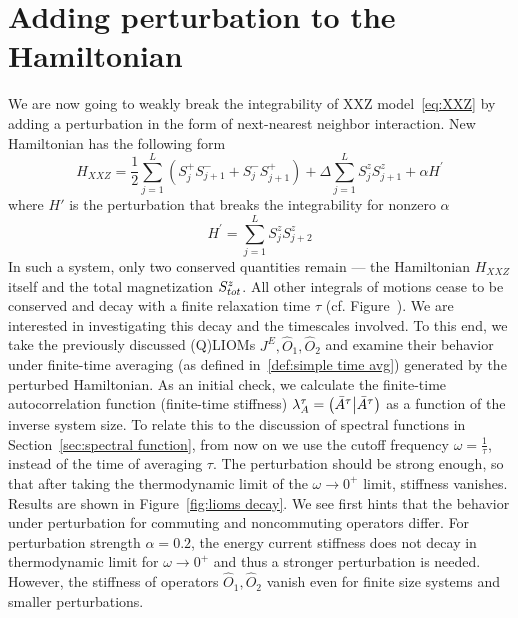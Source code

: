 \section{Adding perturbation to the Hamiltonian}
We are now going to weakly break the integrability of XXZ model~\eqref{eq:XXZ} 
by adding a perturbation in the form of next-nearest neighbor interaction.
New Hamiltonian has the following form
\begin{equation}
    H_{XXZ} = \frac{1}{2}\sum_{j = 1}^{L}\left( S^{+}_{j} S^{-}_{j+1} + 
    S^{-}_{j}S^{+}_{j+1} \right) + \Delta\sum_{j = 1}^{L} S^{z}_{j}S^{z}_{j+1}
    + \alpha H^{\prime}
    \label{eq:HXXZ perturbed}
\end{equation}
where \(H'\) is the perturbation that breaks the integrability for nonzero \(\alpha \)
\begin{equation}
    H^{\prime}=\sum_{j = 1}^{L} S^{z}_{j}S^{z}_{j+2}
    \label{eq:perturbation}
\end{equation}
In such a system, only two conserved quantities remain --- the Hamiltonian \(H_{XXZ}\) itself 
and the total magnetization \(S^{z}_{tot}\). All other integrals of motions cease to be conserved
and decay with a finite relaxation time \(\tau\) (cf. Figure~).
We are interested in investigating this decay and the timescales involved.
To this end, we take the previously discussed (Q)LIOMs \(J^E, \hat{O}_1,\hat{O}_2\)
and examine their behavior under finite-time averaging 
(as defined in~\eqref{def:simple time avg}) generated by the perturbed Hamiltonian.
As an initial check, we calculate the finite-time autocorrelation function (finite-time stiffness)
\(\lambda^{\tau}_A = \left(\bar{A}^{\tau} \middle| \bar{A}^{\tau}\right)\) as a function of the inverse system size.
To relate this to the discussion of spectral functions in Section~\ref{sec:spectral function},
from now on we use the cutoff frequency \(\omega = \frac{1}{\tau}\), instead of the time of
averaging \(\tau\). The perturbation should be strong enough, so that after taking the thermodynamic limit
of the \(\omega \to 0^+\) limit, stiffness vanishes. Results are shown in Figure~\ref{fig:lioms decay}.
We see first hints that the behavior under perturbation for commuting and noncommuting operators
differ. For perturbation strength \(\alpha=0.2\), the energy current stiffness does
not decay in thermodynamic limit for \(\omega \to 0^+\) and thus a stronger perturbation is needed.
However, the stiffness of operators \(\hat{O}_1,\hat{O}_2\) vanish even for finite size systems
and smaller perturbations. 
